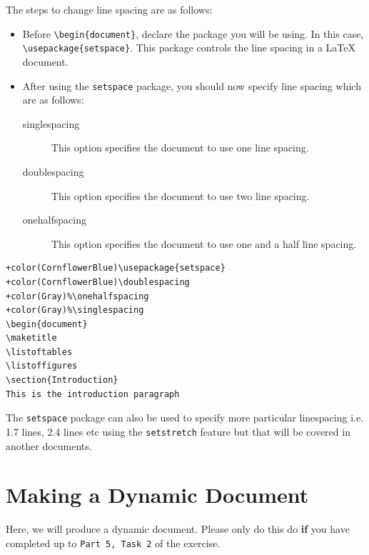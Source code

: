 \documentclass[12pts]{report}
\begin{document}
The steps to change line spacing are as follows:
\begin{itemize}
	\item Before \verb|\begin{document}|, declare the package you will be using. In this case, \verb|\usepackage{setspace}|. This package controls the line spacing in a {\LaTeX} document.
	\item After using the \texttt{setspace} package, you should now specify line spacing which are as follows:
	\begin{description}
		\item[singlespacing] This option specifies the document to use one line spacing.
		\item[doublespacing] This option specifies the document to use two line spacing.
		\item[onehalfspacing] This option specifies the document to use one and a half line spacing. 
	\end{description}
\end{itemize}
\begin{Verbatim}[commandchars=+\(\)]
+color(CornflowerBlue)\usepackage{setspace}
+color(CornflowerBlue)\doublespacing
+color(Gray)%\onehalfspacing
+color(Gray)%\singlespacing
\begin{document}
\maketitle
\listoftables
\listoffigures
\section{Introduction}
This is the introduction paragraph
\end{Verbatim}
The \texttt{setspace} package can also be used to specify more particular linespacing i.e. 1.7 lines, 2.4 lines etc using the \texttt{setstretch} feature but that will be covered in another documents. 

\section*{Making a Dynamic Document}

Here, we will produce a dynamic document. Please only do this do \textbf{if} you have completed up to \texttt{Part 5, Task 2} of the exercise. 
\end{document}
